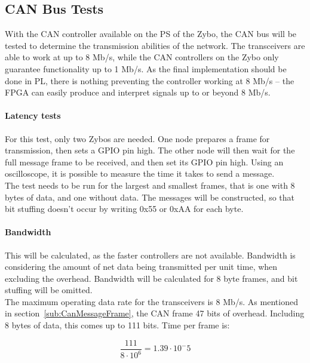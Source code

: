\subsection{CAN Bus Tests}
With the CAN controller available on the PS of the Zybo, the CAN bus will be tested to determine the transmission abilities of the network.
The transceivers are able to work at up to 8 Mb/s, while the CAN controllers on the Zybo only guarantee functionality up to 1 Mb/s. 
As the final implementation should be done in PL, there is nothing preventing the controller working at 8 Mb/s -- the FPGA can easily produce and interpret signals up to or beyond 8 Mb/s.

\paragraph{Latency tests}
For this test, only two Zybos are needed.
One node prepares a frame for transmission, then sets a GPIO pin high.
The other node will then wait for the full message frame to be received, and then set its GPIO pin high.
Using an oscilloscope, it is possible to measure the time it takes to send a message.\\

The test needs to be run for the largest and smallest frames, that is one with 8 bytes of data, and one without data. 
The messages will be constructed, so that bit stuffing doesn't occur by writing 0x55 or 0xAA for each byte. 

\paragraph{Bandwidth}
This will be calculated, as the faster controllers are not available.
Bandwidth is considering the amount of net data being transmitted per unit time, when excluding the overhead.
Bandwidth will be calculated for 8 byte frames, and bit stuffing will be omitted.\\

The maximum operating data rate for the transceivers is 8 Mb/s.
As mentioned in section~\ref{sub:CanMessageFrame}, the CAN frame 47 bits of overhead. 
Including 8 bytes of data, this comes up to 111 bits. 
Time per frame is:

\begin{equation}
\frac{111}{8 \cdot 10^6} = 1.39 \cdot 10^-5
\end{equation}

